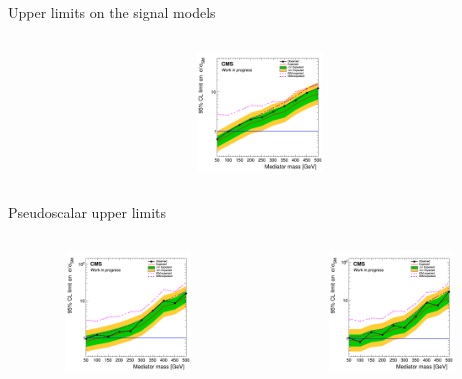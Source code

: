 \documentclass[8pt]{beamer}
\begin{document}
\begin{frame}{Upper limits on the signal models}
\begin{columns}
\begin{column}{0.33\textwidth}
\begin{center}
			\begin{block}{}\end{block} \vspace{-10pt}
     			\includegraphics[width=1.0\textwidth, height=90pt]{figs/limit_scalar_2018_attempt7_v2.png}
    		\end{center}		
		\end{column}
\end{columns}

\begin{columns}
\begin{column}{1.09\textwidth}
\begin{block}{\centering Pseudoscalar upper limits}\end{block}
\end{column}
\end{columns} \vspace{-15pt}
\begin{columns}
		\begin{column}{0.33\textwidth}
			\begin{center}
     			\includegraphics[width=1.0\textwidth, height=90pt]{figs/limit_pseudo_2016_attempt7_v2.png}
    		\end{center}		
		\end{column}
		\begin{column}{0.33\textwidth}
			\begin{center}
     			\includegraphics[width=1.0\textwidth, height=90pt]{figs/limit_pseudo_2017_attempt7_v2.png}

\end{center}
\end{column}
\end{columns}
\end{frame}
\end{document}
